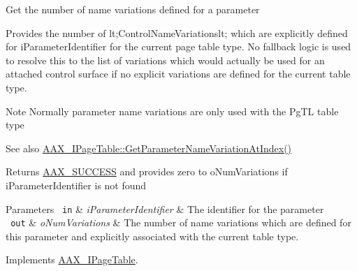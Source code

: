 Get the number of name variations defined for a parameter

Provides the number of {\ttfamily lt;Control\+Name\+Variationslt;} which are explicitly defined for {\ttfamily i\+Parameter\+Identifier} for the current page table type. No fallback logic is used to resolve this to the list of variations which would actually be used for an attached control surface if no explicit variations are defined for the current table type.

\begin{DoxyNote}{Note}
Normally parameter name variations are only used with the {\ttfamily \textquotesingle{}Pg\+TL\textquotesingle{}} table type
\end{DoxyNote}

\begin{DoxyItemize}
\item \begin{DoxySeeAlso}{See also}
\mbox{\hyperlink{a01849_adffe5a5f2ad548bd4c704508d816d568}{A\+A\+X\+\_\+\+I\+Page\+Table\+::\+Get\+Parameter\+Name\+Variation\+At\+Index()}}
\end{DoxySeeAlso}
\begin{DoxyReturn}{Returns}
\mbox{\hyperlink{a00494_a5f8c7439f3a706c4f8315a9609811937aeddbd1bb67e3a66e6af54a4b4a7a57b3}{A\+A\+X\+\_\+\+S\+U\+C\+C\+E\+SS}} and provides zero to {\ttfamily o\+Num\+Variations} if {\ttfamily i\+Parameter\+Identifier} is not found
\end{DoxyReturn}

\begin{DoxyParams}[1]{Parameters}
\mbox{\texttt{ in}}  & {\em i\+Parameter\+Identifier} & The identifier for the parameter \\
\hline
\mbox{\texttt{ out}}  & {\em o\+Num\+Variations} & The number of name variations which are defined for this parameter and explicitly associated with the current table type. \\
\hline
\end{DoxyParams}

\end{DoxyItemize}

Implements \mbox{\hyperlink{a01849_af8be797a3ec7ed3117e720dd29ea7cc7}{A\+A\+X\+\_\+\+I\+Page\+Table}}.

\mbox{\label{a01929_a0a009cc5bfa2e0424d6ed58087bd5962}} 
